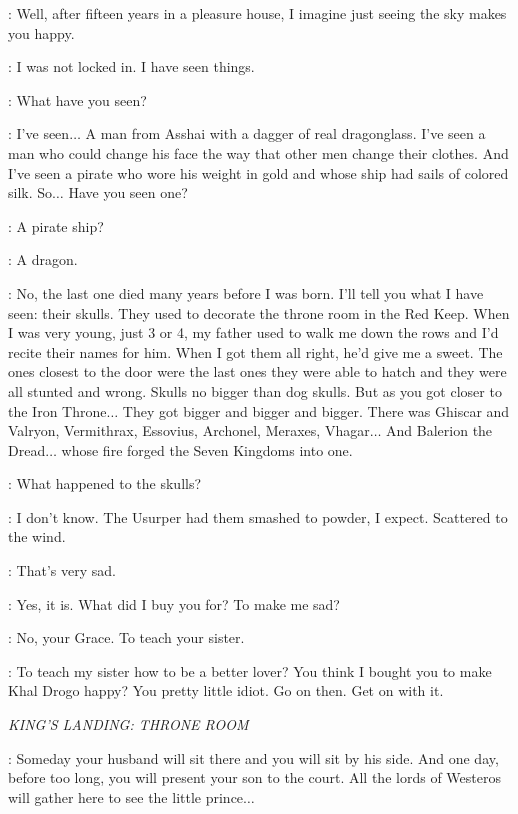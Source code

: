 \VISERYS: Well, after fifteen years in a pleasure house, I imagine just seeing the sky makes you happy. 

\DOREAH: I was not locked in. I have seen things. 

\VISERYS: What have you seen? 

\DOREAH: I've seen$\ldots$ A man from Asshai with a dagger of real dragonglass. I've seen a man who could change his face the way that other men change their clothes. And I've seen a pirate who wore his weight in gold and whose ship had sails of colored silk. So$\ldots$ Have you seen one? 

\VISERYS: A pirate ship? 

\DOREAH: A dragon. 

\VISERYS: No, the last one died many years before I was born. I'll tell you what I have seen: their skulls. They used to decorate the throne room in the Red Keep.  When I was very young, just 3 or 4, my father used to walk me down the rows and I'd recite their names for him. When I got them all right, he'd give me a sweet. The ones closest to the door were the last ones they were able to hatch and they were all stunted and wrong. Skulls no bigger than dog skulls. But as you got closer to the Iron Throne$\ldots$ They got bigger and bigger and bigger. There was Ghiscar and Valryon, Vermithrax, Essovius, Archonel, Meraxes, Vhagar$\ldots$ And Balerion the Dread$\ldots$ whose fire forged the Seven Kingdoms into one. 

\DOREAH: What happened to the skulls? 

\VISERYS: I don't know. The Usurper had them smashed to powder, I expect. Scattered to the wind. 

\DOREAH: That's very sad. 

\VISERYS: Yes, it is. What did I buy you for? To make me sad? 

\DOREAH: No, your Grace. To teach your sister. 

\VISERYS: To teach my sister how to be a better lover? You think I bought you to make Khal Drogo happy? You pretty little idiot. Go on then. Get on with it. 

\scene

\textit{KING'S LANDING: THRONE ROOM}


\SEPTAMORDANE: Someday your husband will sit there and you will sit by his side. And one day, before too long, you will present your son to the court. All the lords of Westeros will gather here to see the little prince$\ldots$ 


